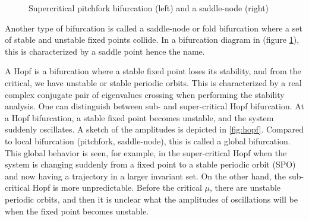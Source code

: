 \begin{figure}[ht]
\centering
\begin{subfigure}[t]{0.3\textwidth}
  \centering
\end{subfigure}
\hspace{0.1\textwidth}
\begin{subfigure}[t]{0.3\textwidth}
  \centering
\end{subfigure}
\caption{Supercritical pitchfork bifurcation (left) and a saddle-node (right)}
  \label{fig:pitch_saddle}
\end{figure}

Another type of bifurcation is called a saddle-node or fold bifurcation where a
set of stable and unstable fixed points collide. In a bifurcation diagram in
(figure \ref{fig:pitch_saddle}), this is characterized by a saddle point hence
the name.

A Hopf is a bifurcation where a stable fixed point loses its stability, and
from the critical, we have unstable or stable periodic orbits. This is
characterized by a real complex conjugate pair of eigenvalues crossing when
performing the stability analysis. One can distinguish between sub- and
super-critical Hopf bifurcation. At a Hopf bifurcation, a stable fixed point
becomes unstable, and the system suddenly oscillates. A sketch of the
amplitudes is depicted in \ref{fig:hopf}. Compared to local bifurcation
(pitchfork, saddle-node), this is called a global bifurcation. This global
behavior is seen, for example, in the super-critical Hopf when the system is
changing suddenly from a fixed point to a stable periodic orbit (SPO) and now
having a trajectory in a larger invariant set. On the other hand, the
sub-critical Hopf is more unpredictable. Before the critical $\mu$, there are
unstable periodic orbits, and then it is unclear what the amplitudes of
oscillations will be when the fixed point becomes unstable.

